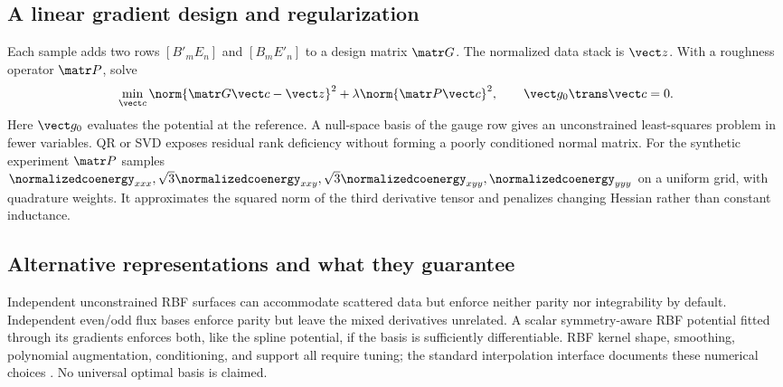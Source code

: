 \subsection{A linear gradient design and regularization}
Each sample adds two rows $[B'_mE_n]$ and $[B_mE'_n]$ to a design matrix
$\matr G$. The normalized data stack is $\vect z$. With a roughness operator
$\matr P$, solve
\begin{equation}
 \min_{\vect c}\norm{\matr G\vect c-\vect z}^2
          +\lambda\norm{\matr P\vect c}^2,
 \qquad \vect g_0\trans\vect c=0.\label{eq:spline-solve}
\end{equation}
Here $\vect g_0$ evaluates the potential at the reference. A null-space basis
of the gauge row gives an unconstrained least-squares problem in fewer
variables. QR or SVD exposes residual rank deficiency without forming a
poorly conditioned normal matrix. For the synthetic experiment $\matr P$
samples $\normalizedcoenergy_{xxx},\sqrt3\normalizedcoenergy_{xxy},\sqrt3\normalizedcoenergy_{xyy},\normalizedcoenergy_{yyy}$ on a uniform grid,
with quadrature weights. It approximates the squared norm of the third
derivative tensor and penalizes changing Hessian rather than constant inductance.

\subsection{Alternative representations and what they guarantee}
Independent unconstrained RBF surfaces can accommodate scattered data but
enforce neither parity nor integrability by default. Independent even/odd
flux bases enforce parity but leave the mixed derivatives unrelated.
A scalar symmetry-aware RBF potential fitted through its gradients enforces
both, like the spline potential, if the basis is sufficiently differentiable.
RBF kernel shape, smoothing, polynomial augmentation, conditioning, and
support all require tuning; the standard interpolation interface documents
these numerical choices \cite{scipy-rbf}. No universal optimal basis is claimed.

